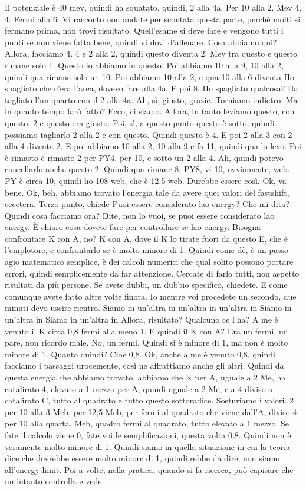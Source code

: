 {\begin{soluzione}
   Il potenziale è 40 mev, quindi ha squatato, quindi, 2 alla 4a. Per 10 alla 2. Mev 4. 4. Fermi alla 6. Vi racconto non andate per scontata questa parte, perché molti si fermano prima, non trovi risultato. Quell'esame si deve fare e vengono tutti i punti se non viene fatta bene, quindi vi dovi d'allenare. Cosa abbiamo qui? Allora, facciamo 4. 4 e 2 alla 2, quindi questo diventa 2. Mev tra questo e questo rimane solo 1. Questo lo abbiamo in questo. Poi abbiamo 10 alla 9, 10 alla 2, quindi qua rimane solo un 10. Poi abbiamo 10 alla 2, e qua 10 alla 6 diventa Ho spagliato che c'era l'area, dovevo fare alla 4a. E poi 8. Ho spagliato qualcosa? Ha tagliato l'un quarto con il 2 alla 4a. Ah, sì, giusto, grazie. Torniamo indietro. Ma in quanto tempo farò fatto? Ecco, ci siamo. Allora, in tanto leviamo questo, con questo, 2 e questo era giusto. Poi, sì, a questo punto questo è sotto, quindi possiamo tagliarlo 2 alla 2 e con questo. Quindi questo è 4. E poi 2 alla 3 con 2 alla 4 diventa 2. E poi abbiamo 10 alla 2, 10 alla 9 e fa 11, quindi qua lo levo. Poi è rimasto è rimasto 2 per PY4, per 10, e sotto un 2 alla 4. Ah, quindi potevo cancellarlo anche questo 2. Quindi qua rimane 8. PY8, vi 10, ovviamente, web. PY è circa 10, quindi ho 108 web, che è 12.5 web. Durebbe essere così. Ok, va bene. Ok, beh, abbiamo trovato l'energia tale da avere quei valori del fastshift, eccetera. Terzo punto, chiede Puoi essere considerato lao energy? Che mi dita? Quindi cosa facciamo ora? Dite, non lo vuoi, se puoi essere considerato lao energy. È chiaro cosa dovete fare per controllare se lao energy. Bisogna confrontare K con A, no? K con A, dove il K lo tirate fuori da questo E, che è l'emplotore, e confrontarlo se è molto minore di 1. Quindi come dè, è un passo agio matematico semplice, è dei calcoli numerici che qual solito possono portare errori, quindi semplicemente da far attenzione. Cercate di farlo tutti, non aspetto risultati da più persone. Se avete dubbi, un dubbio specifico, chiedete. E come comunque avete fatto altre volte finora. Io mentre voi procedete un secondo, due minuti devo uscire rientro. Siamo in un'altra in un'altra in un'altra in Siamo in un'altra in Siamo in un'altra in Allora, risultato? Qualcuno ce l'ha? A me è venuto il K circa 0,8 fermi alla meno 1. E quindi il K con A? Era un fermi, mi pare, non ricordo male. No, un fermi. Quindi sì è minore di 1, ma non è molto minore di 1. Quanto quindi? Cioè 0,8. Ok, anche a me è venuto 0,8, quindi facciamo i passaggi urocemente, così ne affrattiamo anche gli altri. Quindi da questa energia che abbiamo trovato, abbiamo che K per A, uguale a 2 Me, ha catalirato 4, elevato a 1 mezzo per A, quindi uguale a 2 Me, e a 4 diviso a catalirato C, tutto al quadrato e tutto questo sottoradice. Sosturiamo i valori. 2 per 10 alla 3 Meb, per 12,5 Meb, per fermi al quadrato che viene dall'A, diviso 4 per 10 alla quarta, Meb, quadro fermi al quadrato, tutto elevato a 1 mezzo. Se fate il calcolo viene 0, fate voi le semplificazioni, questa volta 0,8. Quindi non è veramente molto minore di 1. Quindi siamo in quella situazione in cui la teoria dice che dovrebbe essere molto minore di 1, quindi,rebbe da dire, non siamo all'energy limit. Poi a volte, nella pratica, quando si fa ricerca, può capisare che un intanto controlla e vede 
\end{soluzione}}
